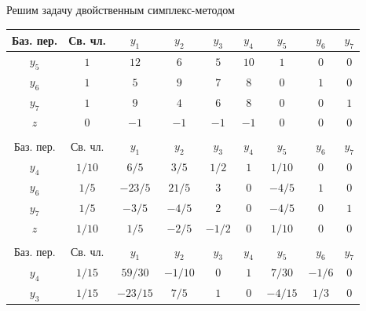 \documentclass[a4paper,14pt]{extarticle}
\begin{document}
Решим задачу двойственным симплекс-методом
\begin{center}
    \begin{longtable}{|c|c|c|c|c|c|c|c|c|}
        \hline
        Баз. пер. & Св. чл.    & $y_1$    & $y_2$    & $y_3$    & $y_4 $     & $y_5$     & $y_6$ & $y_7$     \\
        \hline
        $y_5$     & $1$        & $12$      & $6$      & $5$      & $10$        & $1$      & $0$   & $0$       \\
        \hline
        $y_6$     & $1$        & $5$     & $9$      & $7$      & $8$        & $0$      & $1$   & $0$       \\
        \hline
        $y_7$     & $1$        & $9$     & $4$      & $6$      & $8$        & $0$      & $0$   & $1$       \\
        \hline
        $z$      & $0$        & $-1$     & $-1$     & $-1$     & $-1$       & $0$       & $0$   & $0$       \\
        \hline
        \multicolumn{9}{c}{}                                                                                 \\
        \hline
        Баз. пер. & Св. чл.    & $y_1$    & $y_2$    & $y_3$    & $y_4 $     & $y_5$     & $y_6$ & $y_7$     \\
        \hline
        $y_4$     & $1/10$        & $6/5$      & $3/5$      & $1/2$      & $1$        & $1/10$      & $0$   & $0$       \\
        \hline
        $y_6$     & $1/5$        & $-23/5$     & $21/5$      & $3$      & $0$        & $-4/5$      & $1$   & $0$       \\
        \hline
        $y_7$     & $1/5$        & $-3/5$     & $-4/5$      & $2$      & $0$        & $-4/5$      & $0$   & $1$       \\
        \hline
        $z$      & $1/10$        & $1/5$     & $-2/5$     & $-1/2$     & $0$       & $1/10$       & $0$   & $0$       \\
        \hline
        \multicolumn{9}{c}{}                                                                                 \\
        \hline
        Баз. пер. & Св. чл.    & $y_1$    & $y_2$    & $y_3$    & $y_4 $     & $y_5$     & $y_6$ & $y_7$     \\
        \hline
        $y_4$     & $1/15$        & $59/30$      & $-1/10$      & $0$      & $1$        & $7/30$      & $-1/6$   & $0$       \\
        \hline
        $y_3$     & $1/15$        & $-23/15$     & $7/5$      & $1$      & $0$        & $-4/15$      & $1/3$   & $0$       \\

\end{longtable}
\end{center}
\end{document}
